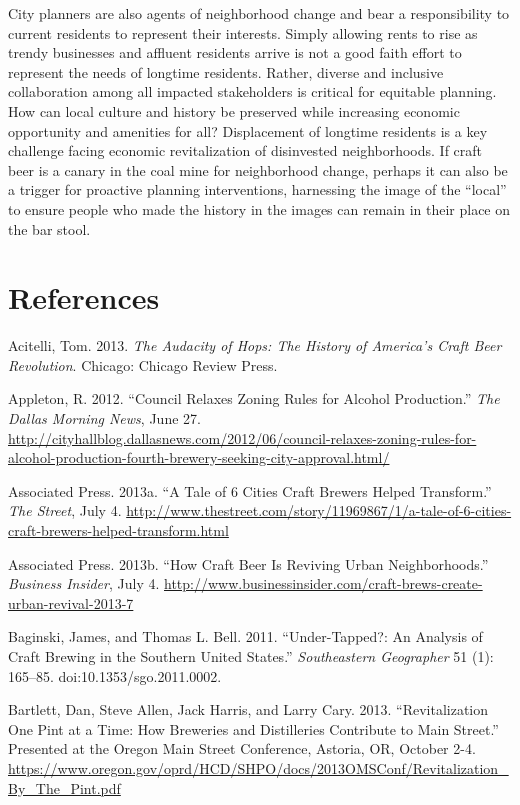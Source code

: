 \documentclass[]{article}
\begin{document}
City planners are also agents of neighborhood change and bear a
responsibility to current residents to represent their interests. Simply
allowing rents to rise as trendy businesses and affluent residents
arrive is not a good faith effort to represent the needs of longtime
residents. Rather, diverse and inclusive collaboration among all
impacted stakeholders is critical for equitable planning. How can local
culture and history be preserved while increasing economic opportunity
and amenities for all? Displacement of longtime residents is a key
challenge facing economic revitalization of disinvested neighborhoods.
If craft beer is a canary in the coal mine for neighborhood change,
perhaps it can also be a trigger for proactive planning interventions,
harnessing the image of the ``local'' to ensure people who made the
history in the images can remain in their place on the bar stool.

\clearpage
\newpage
\section{References}\label{references}

Acitelli, Tom. 2013. \emph{The Audacity of Hops: The History of
America's Craft Beer Revolution}. Chicago: Chicago Review Press.

Appleton, R. 2012. ``Council Relaxes Zoning Rules for Alcohol
Production.'' \emph{The Dallas Morning News}, June 27.
\url{http://cityhallblog.dallasnews.com/2012/06/council-relaxes-zoning-rules-for-alcohol-production-fourth-brewery-seeking-city-approval.html/}

Associated Press. 2013a. ``A Tale of 6 Cities Craft Brewers Helped
Transform.'' \emph{The Street}, July 4.
\url{http://www.thestreet.com/story/11969867/1/a-tale-of-6-cities-craft-brewers-helped-transform.html}

Associated Press. 2013b. ``How Craft Beer Is Reviving Urban
Neighborhoods.'' \emph{Business Insider}, July 4.
\url{http://www.businessinsider.com/craft-brews-create-urban-revival-2013-7}

Baginski, James, and Thomas L. Bell. 2011. ``Under-Tapped?: An Analysis
of Craft Brewing in the Southern United States.'' \emph{Southeastern
Geographer} 51 (1): 165--85. doi:10.1353/sgo.2011.0002.

Bartlett, Dan, Steve Allen, Jack Harris, and Larry Cary. 2013.
``Revitalization One Pint at a Time: How Breweries and Distilleries
Contribute to Main Street.'' Presented at the Oregon Main Street
Conference, Astoria, OR, October 2-4.
\url{https://www.oregon.gov/oprd/HCD/SHPO/docs/2013OMSConf/Revitalization\_By\_The\_Pint.pdf}
\end{document}
